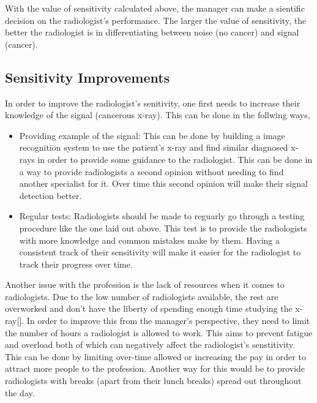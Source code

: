 \documentclass[12pt]{article}
\begin{document}
	With the value of sensitivity calculated above, the manager can make a sientific decision on the radiologist's performance. The larger the value of sensitivity, the better the radiologist is in differentiating between noise (no cancer) and signal (cancer).
	
	\subsection{Sensitivity Improvements}
	
	In order to improve the radiologist's senitivity, one first needs to increase their knowledge of the signal (cancerous x-ray). This can be done in the follwing ways,
	\begin{itemize}
		\item Providing example of the signal: This can be done by building a image recognition system to use the patient's x-ray and find similar diagnosed x-rays in order to provide some guidance to the radiologist. This can be done in a way to provide radiologists a second opinion without needing to find another specialist for it. Over time this second opinion will make their signal detection better.
		\item Regular tests: Radiologists should be made to reguarly go through a testing procedure like the one laid out above. This test is to provide the radiologists with more knowledge and common mistakes make by them. Having a consistent track of their sensitivity will make it easier for the radiologist to track their progress over time.
	\end{itemize}
	
	Another issue with the profession is the lack of resources when it comes to radiologists. Due to the low number of radiologists available, the rest are overworked and don't have the liberty of spending enough time studying the x-ray[]. In order to improve this from the manager's perspective, they need to limit the number of hours a radiologist is allowed to work. This aims to prevent fatigue and overload both of which can negatively affect the radiologist's senstitivity. This can be done by limiting over-time allowed or increasing the pay in order to attract more people to the profession. Another way for this would be to provide radiologists with breaks (apart from their lunch breaks) spread out throughout the day.
	
	
\end{document}
